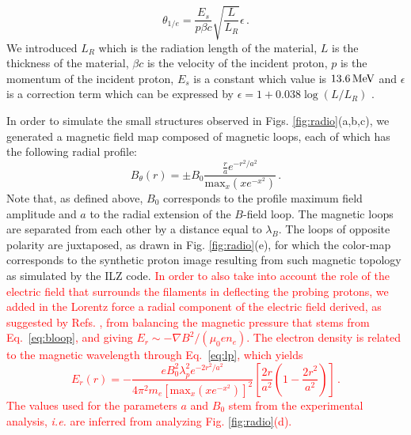 \documentclass[aps,twocolumn,showpacs,superscriptaddress]{revtex4}
\begin{document}
\begin{equation}
\theta_{1/e}  = \frac{E_s}{p\beta c} \sqrt{\frac{L}{L_R}} \epsilon  \, .
\end{equation}
We introduced $L_R$ which is the radiation length of the material, $L$ is the thickness of the material, $\beta c$ is the velocity of the incident proton, $p$ is the momentum of the incident proton, $E_s$ is a constant which value is $13.6\,\rm MeV$ and  $\epsilon$ is a correction term which can be expressed by $\epsilon  = 1 + 0.038 \log\left(L/L_R\right)$ \cite{EPJ_Groom_2000}. 

In order to simulate the small structures observed in Figs. \ref{fig:radio}(a,b,c), we generated a magnetic field map composed of magnetic loops, each of which has the following radial profile:
\begin{equation}\label{eq:bloop}
B_\theta(r)  = \pm B_0  \frac{ \frac{r}{a} e^{-r^2/a^2} }{\mathrm{max}_x(xe^{-x^2})} \, .
\end{equation} %
Note that, as defined above, $B_0$ corresponds to the profile maximum field amplitude and $a$ to the radial extension of the $B$-field loop.
The magnetic loops are separated from each other by a distance equal to $\lambda_B$.
The loops of opposite polarity are juxtaposed, as drawn in Fig. \ref{fig:radio}(e), for which the color-map corresponds to the synthetic proton image resulting from such magnetic topology as simulated by the ILZ code.
\textcolor{red}{
In order to also take into account the role of the electric field that surrounds the filaments in deflecting the probing protons, we added in the Lorentz force a radial component of the electric field  derived, as suggested by Refs. \cite{POP_Dieckmann_2009, POP_Bret_Gremillet_2010}, from balancing the magnetic pressure that stems from Eq.~\eqref{eq:bloop}, and giving $E_r \sim -\nabla B^2 /(\mu_0e n_e)$. The  electron density is related to the magnetic wavelength through Eq.~\eqref{eq:lp}, which yields
\begin{equation}\label{eq:eloop}
E_r(r) = -\frac{  eB_0^2\lambda_p^2   e^{-2r^2/a^2}}{4\pi^2 m_e [\mathrm{max}_x(xe^{-x^2})]^2} \left[ \frac{2r}{a^2}\left( 1-\frac{2r^2}{a^2}\right)  \right]  \, .
\end{equation} 
The values used for the parameters $a$ and $B_0$ stem from the experimental analysis, \emph{i.e.} are inferred from analyzing Fig. \ref{fig:radio}(d). 
}
\end{document}
